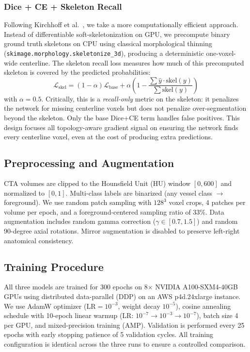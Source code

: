 \documentclass[conference]{IEEEtran}
\begin{document}
\subsubsection{Dice + CE + Skeleton Recall}
Following Kirchhoff et al.~\cite{kirchhoff2024}, we take a more computationally efficient approach. Instead of differentiable soft-skeletonization on GPU, we precompute binary ground truth skeletons on CPU using classical morphological thinning (\texttt{skimage.morphology.skeletonize\_3d}), producing a deterministic one-voxel-wide centerline. The skeleton recall loss measures how much of this precomputed skeleton is covered by the predicted probabilities:
\begin{equation}
    \mathcal{L}_{\text{skel}} = (1-\alpha)\mathcal{L}_{\text{base}} + \alpha\left(1 - \frac{\sum \hat{y} \cdot \text{skel}(y)}{\sum \text{skel}(y)}\right)
\end{equation}
with $\alpha = 0.5$. Critically, this is a \emph{recall-only} metric on the skeleton: it penalizes the network for missing centerline voxels but does not penalize over-segmentation beyond the skeleton. Only the base Dice+CE term handles false positives. This design focuses all topology-aware gradient signal on ensuring the network finds every centerline voxel, even at the cost of producing extra predictions.

\subsection{Preprocessing and Augmentation}

CTA volumes are clipped to the Hounsfield Unit (HU) window $[0, 600]$ and normalized to $[0, 1]$. Multi-class labels are binarized (any vessel class $\rightarrow$ foreground). We use random patch sampling with $128^3$ voxel crops, 4 patches per volume per epoch, and a foreground-centered sampling ratio of 33\%. Data augmentation includes random gamma correction ($\gamma \in [0.7, 1.5]$) and random 90-degree axial rotations. Mirror augmentation is disabled to preserve left-right anatomical consistency.

\subsection{Training Procedure}

All three models are trained for 300 epochs on 8$\times$ NVIDIA A100-SXM4-40GB GPUs using distributed data-parallel (DDP) on an AWS p4d.24xlarge instance. We use AdamW optimizer ($\text{LR}=10^{-3}$, weight decay $10^{-5}$), cosine annealing schedule with 10-epoch linear warmup (LR: $10^{-7} \rightarrow 10^{-3} \rightarrow 10^{-7}$), batch size 4 per GPU, and mixed-precision training (AMP). Validation is performed every 25 epochs with early stopping patience of 5 validation cycles. All training configuration is identical across the three runs to ensure a controlled comparison.
\end{document}

